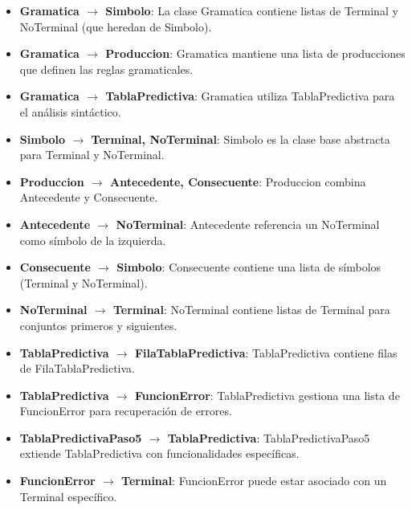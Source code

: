 \begin{itemize}
    \item \textbf{Gramatica $\rightarrow$ Simbolo}: La clase Gramatica contiene listas de Terminal y NoTerminal (que heredan de Simbolo).
    \item \textbf{Gramatica $\rightarrow$ Produccion}: Gramatica mantiene una lista de producciones que definen las reglas gramaticales.
    \item \textbf{Gramatica $\rightarrow$ TablaPredictiva}: Gramatica utiliza TablaPredictiva para el análisis sintáctico.
    \item \textbf{Simbolo $\rightarrow$ Terminal, NoTerminal}: Simbolo es la clase base abstracta para Terminal y NoTerminal.
    \item \textbf{Produccion $\rightarrow$ Antecedente, Consecuente}: Produccion combina Antecedente y Consecuente.
    \item \textbf{Antecedente $\rightarrow$ NoTerminal}: Antecedente referencia un NoTerminal como símbolo de la izquierda.
    \item \textbf{Consecuente $\rightarrow$ Simbolo}: Consecuente contiene una lista de símbolos (Terminal y NoTerminal).
    \item \textbf{NoTerminal $\rightarrow$ Terminal}: NoTerminal contiene listas de Terminal para conjuntos primeros y siguientes.
    \item \textbf{TablaPredictiva $\rightarrow$ FilaTablaPredictiva}: TablaPredictiva contiene filas de FilaTablaPredictiva.
    \item \textbf{TablaPredictiva $\rightarrow$ FuncionError}: TablaPredictiva gestiona una lista de FuncionError para recuperación de errores.
    \item \textbf{TablaPredictivaPaso5 $\rightarrow$ TablaPredictiva}: TablaPredictivaPaso5 extiende TablaPredictiva con funcionalidades específicas.
    \item \textbf{FuncionError $\rightarrow$ Terminal}: FuncionError puede estar asociado con un Terminal específico.
\end{itemize}

